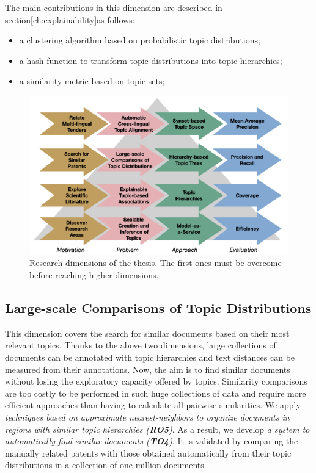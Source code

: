 The main contributions in this dimension are described in section\ref{ch:explainability}as follows:
\begin{itemize}
\item a clustering algorithm based on probabilistic topic distributions;
\item a hash function to transform topic distributions into topic hierarchies;
\item a similarity metric based on topic sets; 
\end{itemize} 

\begin{figure}[!htbp]
\includegraphics[scale=0.25]{dimensions.png}
\centering
\caption{Research dimensions of the thesis. The first ones must be overcome before reaching higher dimensions. }
\label{fig:dimensions}
\end{figure}



\subsection{Large-scale Comparisons of Topic Distributions}

This dimension covers the search for similar documents based on their most relevant topics. Thanks to the above two dimensions, large collections of documents can be annotated with topic hierarchies and text distances can be measured from their annotations. Now, the aim is to find similar documents without losing the exploratory capacity offered by topics. Similarity comparisons are too costly to be performed in such huge collections of data and require more efficient approaches than having to calculate all pairwise similarities. We apply \textit{techniques based on approximate nearest-neighbors to organize documents in regions with similar topic hierarchies (\textbf{RO5})}. As a result, we develop \textit{a system to automatically find similar documents (\textbf{TO4})}. It is validated by comparing the manually related patents with those obtained automatically from their topic distributions in a collection of one million documents \citep{Badenes-Olmedo2020}\citep{Badenes-Olmedo2019b}. 


